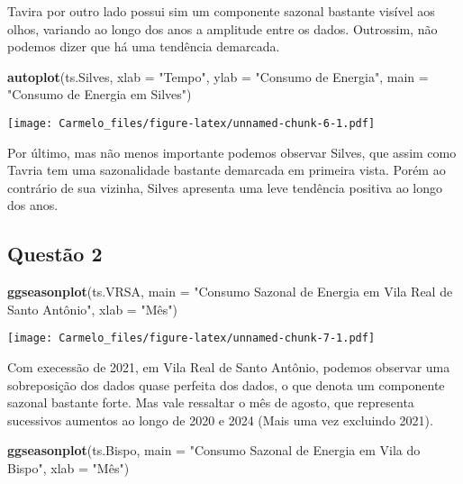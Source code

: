 \documentclass[
  14pt,
]{article}
\newenvironment{Shaded}{\begin{snugshade}}{\end{snugshade}}
\newcommand{\AttributeTok}[1]{\textcolor[rgb]{0.13,0.29,0.53}{#1}}
\newcommand{\FunctionTok}[1]{\textcolor[rgb]{0.13,0.29,0.53}{\textbf{#1}}}
\newcommand{\NormalTok}[1]{#1}
\newcommand{\StringTok}[1]{\textcolor[rgb]{0.31,0.60,0.02}{#1}}
\begin{document}
Tavira por outro lado possui sim um componente sazonal bastante visível
aos olhos, variando ao longo dos anos a amplitude entre os dados.
Outrossim, não podemos dizer que há uma tendência demarcada.

\begin{Shaded}
\begin{Highlighting}[]
\FunctionTok{autoplot}\NormalTok{(ts.Silves, }\AttributeTok{xlab =} \StringTok{"Tempo"}\NormalTok{, }\AttributeTok{ylab =} \StringTok{"Consumo de Energia"}\NormalTok{, }\AttributeTok{main =} \StringTok{"Consumo de Energia em Silves"}\NormalTok{)}
\end{Highlighting}
\end{Shaded}

\texttt{[image: Carmelo\_files/figure-latex/unnamed-chunk-6-1.pdf]}

Por último, mas não menos importante podemos observar Silves, que assim
como Tavria tem uma sazonalidade bastante demarcada em primeira vista.
Porém ao contrário de sua vizinha, Silves apresenta uma leve tendência
positiva ao longo dos anos.

\subsection{Questão 2}\label{questuxe3o-2}

\begin{Shaded}
\begin{Highlighting}[]
\FunctionTok{ggseasonplot}\NormalTok{(ts.VRSA, }\AttributeTok{main =} \StringTok{"Consumo Sazonal de Energia em Vila Real de Santo Antônio"}\NormalTok{, }\AttributeTok{xlab =} \StringTok{"Mês"}\NormalTok{)}
\end{Highlighting}
\end{Shaded}

\texttt{[image: Carmelo\_files/figure-latex/unnamed-chunk-7-1.pdf]}

Com execessão de 2021, em Vila Real de Santo Antônio, podemos observar
uma sobreposição dos dados quase perfeita dos dados, o que denota um
componente sazonal bastante forte. Mas vale ressaltar o mês de agosto,
que representa sucessivos aumentos ao longo de 2020 e 2024 (Mais uma vez
excluindo 2021).

\begin{Shaded}
\begin{Highlighting}[]
\FunctionTok{ggseasonplot}\NormalTok{(ts.Bispo, }\AttributeTok{main =} \StringTok{"Consumo Sazonal de Energia em Vila do Bispo"}\NormalTok{, }\AttributeTok{xlab =} \StringTok{"Mês"}\NormalTok{)}
\end{Highlighting}
\end{Shaded}
\end{document}
